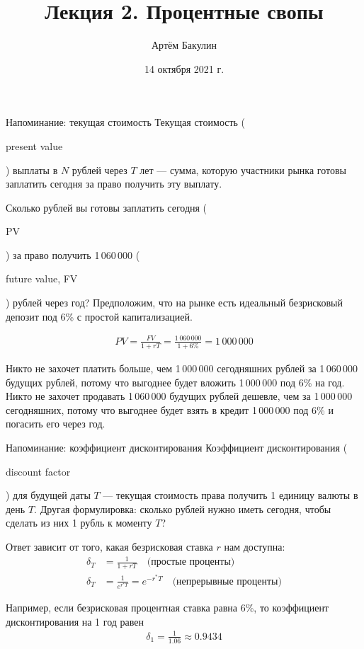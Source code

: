 \documentclass{beamer}
\title{Лекция 2. Процентные свопы}
\author{Артём Бакулин}
\date{14 октября 2021 г.}
\newcommand{\en}[1]{\begin{otherlanguage}{english}#1\end{otherlanguage}}
\begin{document}
\begin{frame}
\titlepage
\end{frame}



\begin{frame}{Напоминание: текущая стоимость}
\justify
\alert{Текущая стоимость} (\en{present value}) выплаты в $N$ рублей через $T$ лет --- сумма, 
которую участники рынка готовы заплатить сегодня за право получить эту выплату.

\justify
Сколько рублей вы готовы заплатить сегодня (\en{PV}) за право получить 1\,060\,000 (\en{future value, FV}) рублей через год? Предположим, что на рынке есть идеальный безрисковый депозит под 6\% с простой капитализацией.

\begin{align*}
PV = \frac{FV}{1+rT} = \frac{1\,060\,000}{1 + 6\%} = 1\,000\,000
\end{align*}

\justify
Никто не захочет платить больше, чем 1\,000\,000 сегодняшних рублей за 1\,060\,000 будущих рублей, потому что выгоднее будет вложить 1\,000\,000 под 6\% на год. Никто не захочет продавать 1\,060\,000 будущих рублей дешевле, чем за 1\,000\,000 сегодняшних, потому что выгоднее будет взять в кредит 1\,000\,000 под 6\% и погасить его через год.
\end{frame}



\begin{frame}{Напоминание: коэффициент дисконтирования}
\justify
\alert{Коэффициент дисконтирования} (\en{discount factor}) для будущей даты $T$ --- текущая стоимость права получить 1 единицу валюты в день $T$. Другая формулировка: сколько рублей нужно иметь сегодня, чтобы сделать из них 1 рубль к моменту $T$?

\justify
Ответ зависит от того, какая безрисковая ставка $r$ нам доступна:
\begin{align*}
\delta_T &= \frac{1}{1 + rT} \quad \text{(простые проценты)} \\
\delta_T &= \frac{1}{e^{r^*T}} = e^{-r^*T} \quad \text{(непрерывные проценты)}
\end{align*}

\justify
Например, если безрисковая процентная ставка равна 6\%, то коэффициент дисконтирования на 1 год равен
\begin{align*}
\delta_1 = \frac{1}{1.06} \approx 0.9434
\end{align*}
\end{frame}
\end{document}
